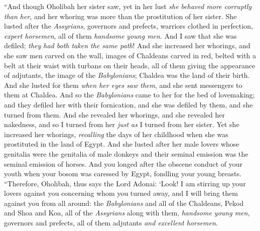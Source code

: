 \begin{biblechapter}
\verse “And though Oholibah her sister saw, yet in her lust \textit{she behaved more corruptly than her}, and her whoring was more than the prostitution of her sister.
\verse She lusted after the \textit{Assyrians}, governors and prefects, warriors clothed in perfection, \textit{expert horsemen}, all of them \textit{handsome young men}.
\verse And I saw that she was defiled; \textit{they had both taken the same path}!
\verse And she increased her whorings, and she saw men carved on the wall, images of Chaldeans carved in red,
\verse belted with a belt at their waist with turbans on their heads, all of them giving the appearance of adjutants, the image of the \textit{Babylonians}; Chaldea was the land of their birth.
\verse And she lusted for them \textit{when her eyes saw them}, and she sent messengers to them at Chaldea.
\verse And so the \textit{Babylonians} came to her for the bed of lovemaking; and they defiled her with their fornication, and she was defiled by them, and she turned from them.
\verse And she revealed her whorings, and she revealed her nakedness, and so I turned from her \textit{just as} I turned from her sister.
\verse Yet she increased her whorings, \textit{recalling} the days of her childhood when she was prostituted in the land of Egypt.
\verse And she lusted after her male lovers whose genitalia were the genitalia of male donkeys and their seminal emission was the seminal emission of horses.
\verse And you longed after the obscene conduct of your youth when your bosom was caressed by Egypt, fondling your young breasts.
\verse “Therefore, Oholibah, thus says the Lord Adonai: ‘Look! I am stirring up your lovers against you concerning whom you turned away, and I will bring them against you from all around:
\verse the \textit{Babylonians} and all of the Chaldeans, Pekod and Shoa and Koa, all of the \textit{Assyrians} along with them, \textit{handsome young men}, governors and prefects, all of them adjutants \textit{and excellent horsemen}.

\end{biblechapter}
